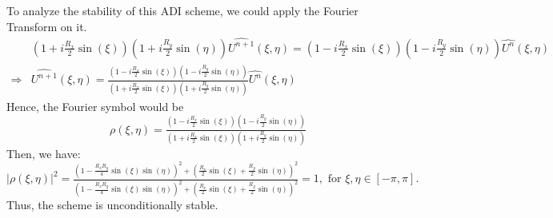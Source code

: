 \begin{answer}
    To analyze the stability of this ADI scheme, we could apply the Fourier Transform on it.
    \begin{equation}
        \begin{aligned}
            &\left(1+i\tfrac{R_x}{2}\sin(\xi)\right)\left(1+i\tfrac{R_y}{2}\sin(\eta)\right)\widehat{U^{n+1}}(\xi,\eta) = \left(1-i\tfrac{R_x}{2}\sin(\xi)\right)\left(1-i\tfrac{R_y}{2}\sin(\eta)\right)\widehat{U^{n}}(\xi,\eta)\\
            \Rightarrow &\widehat{U^{n+1}}(\xi,\eta) = \tfrac{\left(1-i\frac{R_x}{2}\sin(\xi)\right)\left(1-i\frac{R_y}{2}\sin(\eta)\right)}{\left(1+i\frac{R_x}{2}\sin(\xi)\right)\left(1+i\frac{R_y}{2}\sin(\eta)\right)}\widehat{{U^{n}}}(\xi,\eta)
        \end{aligned}
    \end{equation}
    Hence, the Fourier symbol would be
    \begin{equation}
        \rho(\xi,\eta) = \tfrac{\left(1-i\frac{R_x}{2}\sin(\xi)\right)\left(1-i\frac{R_y}{2}\sin(\eta)\right)}{\left(1+i\frac{R_x}{2}\sin(\xi)\right)\left(1+i\frac{R_y}{2}\sin(\eta)\right)}
    \end{equation}
    Then, we have:
    \begin{equation}
        \lvert \rho(\xi,\eta) \rvert^2 = \tfrac{\left(1-\frac{R_xR_y}{4}\sin(\xi)\sin(\eta)\right)^2 + \left(\frac{R_x}{2}\sin(\xi)+\frac{R_y}{2}\sin(\eta)\right)^2}{\left(1-\frac{R_xR_y}{4}\sin(\xi)\sin(\eta)\right)^2 + \left(\frac{R_x}{2}\sin(\xi)+\frac{R_y}{2}\sin(\eta)\right)^2}  = 1, \text{ for $\xi, \eta \in [-\pi,\pi]$}.
    \end{equation}
    Thus, the scheme is unconditionally stable.
\end{answer}